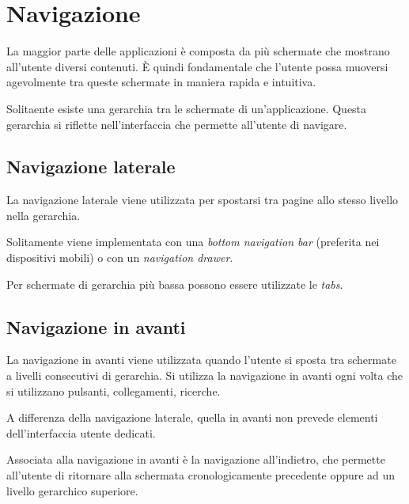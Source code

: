 \documentclass[12pt, a4paper]{report}
\begin{document}
		
	\section{Navigazione}
    	La maggior parte delle applicazioni è composta da più schermate che mostrano all’utente diversi contenuti. È quindi fondamentale che l’utente possa muoversi agevolmente tra queste schermate in maniera rapida e intuitiva.

    	Solitaente esiste una gerarchia tra le schermate di un'applicazione. Questa gerarchia si riflette nell'interfaccia che permette all'utente di navigare.

    		\subsection{Navigazione laterale}
    		La navigazione laterale viene utilizzata per spostarsi tra pagine allo stesso livello nella gerarchia.

    		Solitamente viene implementata con una \textit{bottom navigation bar} (preferita nei dispositivi mobili) o con un \textit{navigation drawer}.

    		Per schermate di gerarchia più bassa possono essere utilizzate le \textit{tabs}.

    		\subsection{Navigazione in avanti}
    		La navigazione in avanti viene utilizzata quando l'utente si sposta tra schermate a livelli consecutivi di gerarchia. Si utilizza la navigazione in avanti ogni volta che si utilizzano pulsanti, collegamenti, ricerche.

    		A differenza della navigazione laterale, quella in avanti non prevede elementi dell'interfaccia utente dedicati.

    		Associata alla navigazione in avanti è la navigazione all'indietro, che permette all'utente di ritornare alla schermata cronologicamente precedente oppure ad un livello gerarchico superiore.
\end{document}
